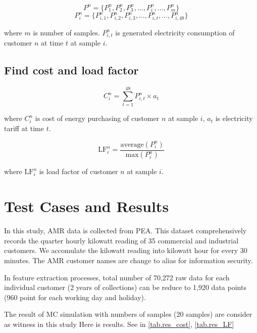 \documentclass[conference]{IEEEtran}
\begin{document}
\begin{equation}
P^{n}=\big\{ P_{1}^{n}, P_{2}^{n}, P_{3}^{n}, ..., P_{i}^{n}, ..., P_{m}^{n}\big\}
\label{eq.generated_kW_cust_n}
\end{equation}
\begin{equation}
P_{i}^{n}=\big\{ P_{i,1}^{n}, P_{i,2}^{n}, P_{i,3}^{n}, ..., P_{i,t}^{n}, ..., P_{i,48}^{n}\big\}
\label{eq.generated_kW_cust_n_at_sample_i}
\end{equation}

where $m$ is number of samples. $P_{i,t}^{n}$ is generated electricity consumption of customer $n$ at time $t$ at sample $i$.


\subsection{Find cost and load factor}


\begin{equation}
C_{i}^{n}=\sum_{t=1}^{48}   P_{i,t}^{n} \times a_{t}
\label{eq.cost}
\end{equation}

where $C_{i}^{n}$ is cost of energy purchasing of customer $n$ at sample $i$, $a_{t}$ is electricity tariff at time $t$.

\begin{equation}
\text{LF}_{i}^{n}=\frac{\text{average}(P_{i}^{n})}{\text{max}(P_{i}^{n})}
\label{eq.load_factor}
\end{equation}

where $\text{LF}_{i}^{n}$ is load factor of customer $n$ at sample $i$.

\section{Test Cases and Results}
In this study, AMR data is collected from PEA. This dataset comprehensively records the quarter hourly kilowatt reading of 35 commercial and industrial customers. We accomulate the kilowatt reading into kilowatt hour for every 30 minutes. The AMR customer names are change to alias for information security.

In feature extraction processes, total number of 70,272 raw data for each individual customer (2 years of collections) can be reduce to 1,920 data points (960 point for each working day and holiday).


The result of MC simulation with numbers of samples (20 samples) are consider as witness in this study
Here is results. See in \ref{tab.res_cost}, \ref{tab.res_LF}
\end{document}
